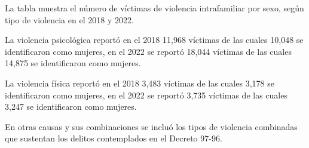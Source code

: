 La tabla muestra el número de víctimas de violencia intrafamiliar por sexo, según tipo de violencia en el 2018 y 2022. 

La violencia psicológica reportó en el 2018 11,968 víctimas de las cuales 10,048 se identificaron como mujeres, en el 2022 se reportó 18,044 víctimas de las cuales 14,875 se identificaron como mujeres. 

La violencia física reportó en el 2018 3,483 víctimas de las cuales 3,178 se identificaron como mujeres, en el 2022 se reportó 3,735 víctimas de las cuales 3,247 se identificaron como mujeres. 

En otras causas y sus combinaciones se incluó los tipos de violencia combinadas que sustentan los delitos contemplados en el Decreto 97-96.